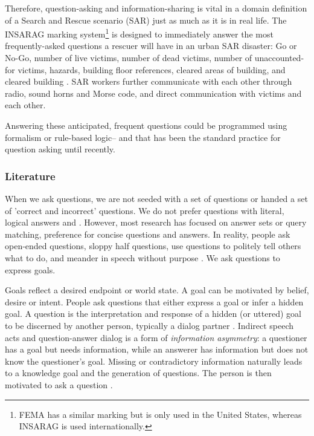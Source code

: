 Therefore, question-asking and information-sharing is vital in a domain definition of a Search and Rescue scenario (SAR) just as much as it is in real life. The INSARAG marking system\footnote{FEMA has a similar marking but is only used in the United States, whereas INSARAG is used internationally.} is designed to immediately answer the most frequently-asked questions a rescuer will have in an urban SAR disaster: Go or No-Go, number of live victims, number of dead victims, number of unaccounted-for victims, hazards, building floor references, cleared areas of building, and cleared building \citet{insarag_2022}. SAR workers further communicate with each other through radio, sound horns and Morse code, and direct communication with victims and each other.

Answering these anticipated, frequent questions could be programmed using formalism or rule-based logic-- and that has been the standard practice for question asking until recently. 



\subsubsection{Literature}
When we ask questions, we are not seeded with a set of questions or handed a set of 'correct and incorrect' questions. We do not prefer questions with literal, logical answers \citet{rothe_lake_gureckis_2017} and \citet{clark_1979}. However, most research has focused on answer sets or query matching, preference for concise
questions and answers. In reality, people ask open-ended questions, sloppy half questions, use questions to politely tell others what to do, and meander in speech without
purpose \citet{brown_1980}. We ask questions to express goals. 

Goals reflect a desired endpoint or world state. A goal can be motivated by belief, desire or intent. People ask questions that either express a goal or infer a hidden goal. 
A question is the interpretation and response of a hidden (or uttered) goal to be discerned
by another person, typically a dialog partner \citet{hawkins_goodman_2017}. Indirect speech acts and question-answer dialog is a form
of \emph{information asymmetry}: a questioner has a goal but needs information,
while an answerer has information but does not know the questioner’s goal. Missing or contradictory information naturally leads to a knowledge goal and the generation of questions. The person is then motivated to ask a question \citet{alaimi_2020}. 

